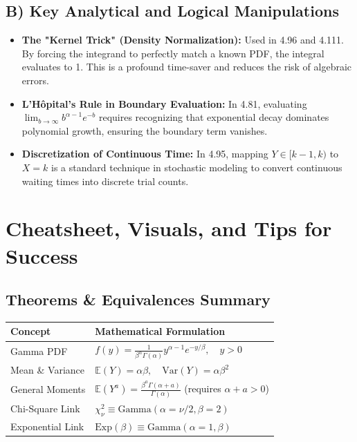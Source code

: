 \documentclass[11pt, a4paper]{article}
\theoremstyle{definition}
\theoremstyle{remark}
\newcommand{\E}{\mathbb{E}}
\begin{document}
\subsection{B) Key Analytical and Logical Manipulations}
\begin{itemize}
    \item \textbf{The "Kernel Trick" (Density Normalization):} Used in 4.96 and 4.111. By forcing the integrand to perfectly match a known PDF, the integral evaluates to 1. This is a profound time-saver and reduces the risk of algebraic errors.
    \item \textbf{L'Hôpital's Rule in Boundary Evaluation:} In 4.81, evaluating $\lim_{b \to \infty} b^{\alpha-1}e^{-b}$ requires recognizing that exponential decay dominates polynomial growth, ensuring the boundary term vanishes.
    \item \textbf{Discretization of Continuous Time:} In 4.95, mapping $Y \in [k-1, k)$ to $X=k$ is a standard technique in stochastic modeling to convert continuous waiting times into discrete trial counts.
\end{itemize}

\section{Cheatsheet, Visuals, and Tips for Success}

\subsection{Theorems \& Equivalences Summary}
\begin{table}[h!]
\centering
\begin{tabularx}{\textwidth}{lX}
\toprule
\textbf{Concept} & \textbf{Mathematical Formulation} \\
\midrule
Gamma PDF & $f(y) = \frac{1}{\beta^\alpha \Gamma(\alpha)} y^{\alpha-1} e^{-y/\beta}, \quad y > 0$ \\
Mean \& Variance & $\E(Y) = \alpha\beta, \quad \text{Var}(Y) = \alpha\beta^2$ \\
General Moments & $\E(Y^a) = \frac{\beta^a \Gamma(\alpha+a)}{\Gamma(\alpha)}$ (requires $\alpha+a > 0$) \\
Chi-Square Link & $\chi^2_\nu \equiv \text{Gamma}(\alpha = \nu/2, \beta = 2)$ \\
Exponential Link & $\text{Exp}(\beta) \equiv \text{Gamma}(\alpha = 1, \beta)$ \\
\bottomrule
\end{tabularx}
\end{table}
\end{document}
